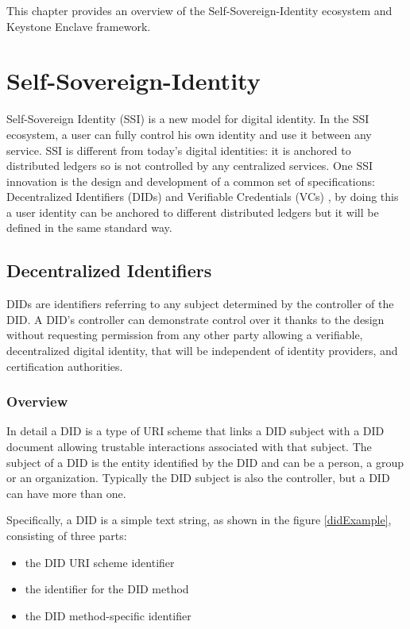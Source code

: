 
This chapter provides an overview of the Self-Sovereign-Identity ecosystem and Keystone Enclave framework.

\section{Self-Sovereign-Identity}
Self-Sovereign Identity (SSI) \cite{tobin2016inevitable} is a new model for digital identity. In the SSI ecosystem, a user can fully control his own identity and use it between any service. SSI is different from today's digital identities: it is anchored to distributed ledgers so is not controlled by any centralized services.
One SSI innovation is the design and development of a common set of specifications: 
Decentralized Identifiers (DIDs) \cite{didW3C} and Verifiable Credentials (VCs) \cite{vcW3C}, by doing this a user identity can be anchored to different distributed ledgers but it will be defined in the same standard way.

\subsection{Decentralized Identifiers}  
DIDs \cite{didW3C} are identifiers referring to any subject determined by the controller of the DID.
A DID's controller can demonstrate control over it thanks to the design without requesting permission from any other party allowing a verifiable, decentralized digital identity, that will be independent of identity providers, and certification authorities.

\subsubsection*{Overview}

In detail a DID is a type of URI \cite{berners2005uniform} scheme that links a DID subject with a DID document allowing trustable interactions associated with that subject. The subject of a DID is the entity identified by the DID and can be a person, a group or an organization. Typically the DID subject is also the controller, but a DID can have more than one. 

Specifically, a DID is a simple text string, as shown in the figure \ref{didExample}, consisting of three parts: 
\begin{itemize}
    \item the DID URI scheme identifier
    \item the identifier for the DID method
    \item the DID method-specific identifier
\end{itemize}

